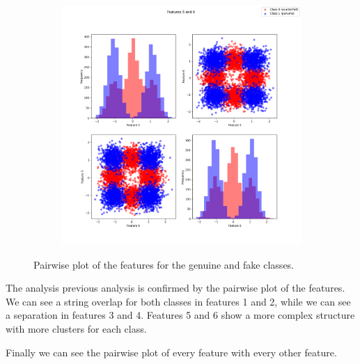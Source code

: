 \documentclass[12pt]{report}
\newcommand{\nnl}{%
    \newline
    \newline
}
\begin{document}
\begin{figure}[H]
\begin{subfigure}[t]{0.33\textwidth}
    \end{subfigure}
    \begin{subfigure}[t]{0.32\textwidth}
        \includegraphics[width=\textwidth]{./plot/features/features_5_6.png}
    \end{subfigure}
    \caption{Pairwise plot of the features for the genuine and fake classes.}
    \label{fig:pairwise_plot}
\end{figure}
\noindent
The analysis previous analysis is confirmed by the pairwise plot of the features. We can see a string overlap for both classes in features 1 and 2, while we can see a separation in features 3 and 4. Features 5 and 6 show a more complex structure with more clusters for each class.
\nnl
Finally we can see the pairwise plot of every feature with every other feature.
\end{document}
